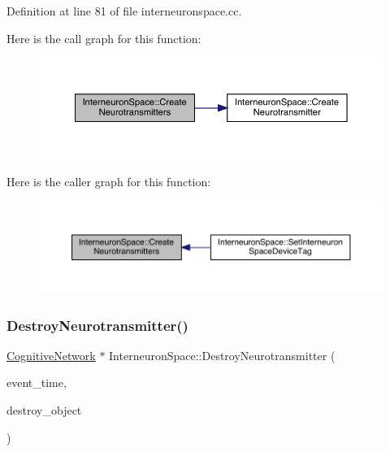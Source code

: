 Definition at line 81 of file interneuronspace.\+cc.

Here is the call graph for this function\+:\nopagebreak
\begin{figure}[H]
\begin{center}
\leavevmode
\includegraphics[width=350pt]{class_interneuron_space_af69f7190226d77a30a80d66d7c28e0ba_cgraph}
\end{center}
\end{figure}
Here is the caller graph for this function\+:\nopagebreak
\begin{figure}[H]
\begin{center}
\leavevmode
\includegraphics[width=350pt]{class_interneuron_space_af69f7190226d77a30a80d66d7c28e0ba_icgraph}
\end{center}
\end{figure}
\mbox{\label{class_interneuron_space_a41eb332165b0a67c3549bd73a8faa969}} 
\subsubsection{\texorpdfstring{Destroy\+Neurotransmitter()}{DestroyNeurotransmitter()}}
{\footnotesize\ttfamily \hyperlink{class_cognitive_network}{Cognitive\+Network} $\ast$ Interneuron\+Space\+::\+Destroy\+Neurotransmitter (\begin{DoxyParamCaption}\item[{std\+::chrono\+::time\+\_\+point$<$ \hyperlink{universe_8h_a0ef8d951d1ca5ab3cfaf7ab4c7a6fd80}{Clock} $>$}]{event\+\_\+time,  }\item[{\hyperlink{class_cognitive_network}{Cognitive\+Network} $\ast$}]{destroy\+\_\+object }\end{DoxyParamCaption})}



